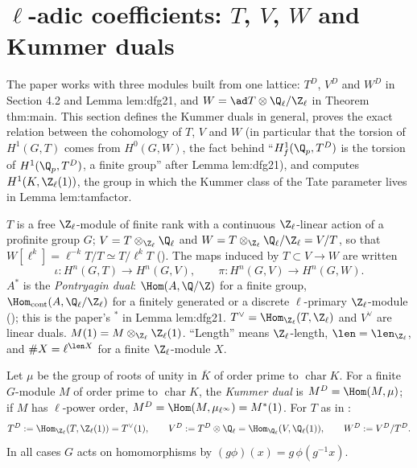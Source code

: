 \section{\texorpdfstring{$\ell$}{l}-adic coefficients: \texorpdfstring{$T$}{T}, \texorpdfstring{$V$}{V}, \texorpdfstring{$W$}{W} and Kummer duals}\label{sec:galcoh:ladic}

The paper works with three modules built from one lattice: $T^D$, $V^D$ and $W^D$ in Section 4.2 and Lemma lem:dfg21, and $W=\ad T\otimes\Q_\ell/\Z_\ell$ in
Theorem thm:main. This section defines the Kummer duals in general, proves the exact relation between the cohomology of $T$, $V$ and $W$ (in particular that the
torsion of $H^1(G,T)$ comes from $H^0(G,W)$, the fact behind ``$H^1_f(\Q_p,T^D)$ is the torsion of $H^1(\Q_p,T^D)$, a finite group'' after Lemma lem:dfg21), and
computes $H^1(K,\Z_\ell(1))$, the group in which the Kummer class of the Tate parameter lives in Lemma lem:tamfactor.

\begin{convention}\label{conv:galcoh:duals}
$T$ is a free $\Z_\ell$-module of finite rank with a continuous $\Z_\ell$-linear action of a profinite group $G$; $V=T\otimes_{\Z_\ell}\Q_\ell$ and
$W=T\otimes_{\Z_\ell}\Q_\ell/\Z_\ell=V/T$, so that $W[\ell^k]=\ell^{-k}T/T\simeq T/\ell^kT$ (). The maps induced by $T\subset V\to W$ are written
\[
\iota\colon H^n(G,T)\to H^n(G,V),\qquad\pi\colon H^n(G,V)\to H^n(G,W).
\]
$A^*$ is the \emph{Pontryagin dual}: $\Hom(A,\Q/\Z)$ for a finite group, $\Hom_{\mathrm{cont}}(A,\Q_\ell/\Z_\ell)$ for a finitely generated or a discrete $\ell$-primary
$\Z_\ell$-module (); this is the paper's ${}^*$ in Lemma lem:dfg21. $T^\vee=\Hom_{\Z_\ell}(T,\Z_\ell)$ and $V^\vee$ are linear duals. $M(1)=M\otimes_{\Z_\ell}\Z_\ell(1)$.
``Length'' means $\Z_\ell$-length, $\len=\len_{\Z_\ell}$, and $\#X=\ell^{\len X}$ for a finite $\Z_\ell$-module $X$.
\end{convention}

\begin{definition}\label{def:galcoh:kummer-duals}
Let $\mu$ be the group of roots of unity in $\overline K$ of order prime to $\operatorname{char}K$. For a finite
$G$-module $M$ of order prime to $\operatorname{char}K$, the \emph{Kummer dual} is $M^D=\Hom(M,\mu)$; if $M$ has $\ell$-power order, $M^D=\Hom(M,\mu_{\ell^\infty})=M^*(1)$. For
$T$ as in :
\[
T^D:=\Hom_{\Z_\ell}(T,\Z_\ell(1))=T^\vee(1),\qquad V^D:=T^D\otimes\Q_\ell=\Hom_{\Q_\ell}(V,\Q_\ell(1)),\qquad W^D:=V^D/T^D .
\]
In all cases $G$ acts on homomorphisms by $(g\phi)(x)=g\,\phi(g^{-1}x)$.
\end{definition}

